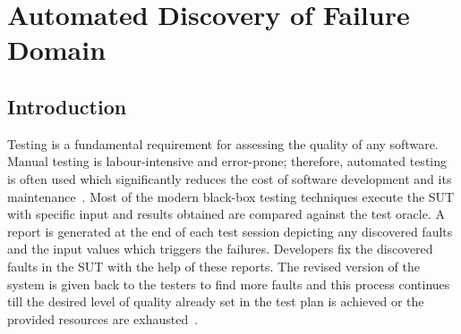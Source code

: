 
\chapter{Automated Discovery of Failure Domain}
\label{chap:ADFD}

\section{Introduction}\label{sec:intro5}
Testing is a fundamental requirement for assessing the quality of any software. Manual testing is labour-intensive and error-prone; therefore, automated testing is often used which significantly reduces the cost of software development and its maintenance~\cite{beizer1995black}. Most of the modern black-box testing techniques execute the SUT with specific input and results obtained are compared against the test oracle. A report is generated at the end of each test session depicting any discovered faults and the input values which triggers the failures. Developers fix the discovered faults in the SUT with the help of these reports. The revised version of the system is given back to the testers to find more faults and this process continues till the desired level of quality already set in the test plan is achieved or the provided resources are exhausted~\cite{parnin2011automated}.


